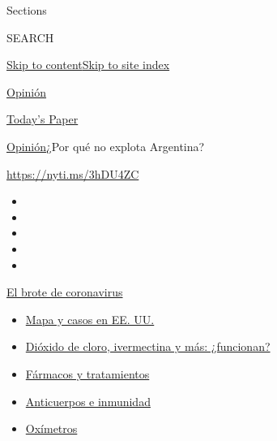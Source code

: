 Sections

SEARCH

\protect\hyperlink{site-content}{Skip to
content}\protect\hyperlink{site-index}{Skip to site index}

\href{https://www.nytimes.com/es/section/opinion}{Opinión}

\href{https://myaccount.nytimes.com/auth/login?response_type=cookie\&client_id=vi}{}

\href{https://www.nytimes.com/section/todayspaper}{Today's Paper}

\href{/es/section/opinion}{Opinión}\textbar{}¿Por qué no explota
Argentina?

\url{https://nyti.ms/3hDU4ZC}

\begin{itemize}
\item
\item
\item
\item
\item
\end{itemize}

\href{https://www.nytimes.com/es/spotlight/coronavirus?action=click\&pgtype=Article\&state=default\&region=TOP_BANNER\&context=storylines_menu}{El
brote de coronavirus}

\begin{itemize}
\tightlist
\item
  \href{https://www.nytimes.com/es/interactive/2020/espanol/mundo/coronavirus-en-estados-unidos.html?action=click\&pgtype=Article\&state=default\&region=TOP_BANNER\&context=storylines_menu}{Mapa
  y casos en EE. UU.}
\item
  \href{https://www.nytimes.com/es/2020/07/23/espanol/america-latina/bolivia-cloro-coronavirus-ivermectina.html?action=click\&pgtype=Article\&state=default\&region=TOP_BANNER\&context=storylines_menu}{Dióxido
  de cloro, ivermectina y más: ¿funcionan?}
\item
  \href{https://www.nytimes.com/es/interactive/2020/science/coronavirus-tratamientos-curas.html?action=click\&pgtype=Article\&state=default\&region=TOP_BANNER\&context=storylines_menu}{Fármacos
  y tratamientos}
\item
  \href{https://www.nytimes.com/es/2020/07/28/espanol/ciencia-y-tecnologia/anticuerpos-coronavirus-inmunidad.html?action=click\&pgtype=Article\&state=default\&region=TOP_BANNER\&context=storylines_menu}{Anticuerpos
  e inmunidad}
\item
  \href{https://www.nytimes.com/es/2020/04/29/espanol/estilos-de-vida/oximetro-para-que-sirve.html?action=click\&pgtype=Article\&state=default\&region=TOP_BANNER\&context=storylines_menu}{Oxímetros}
\end{itemize}


